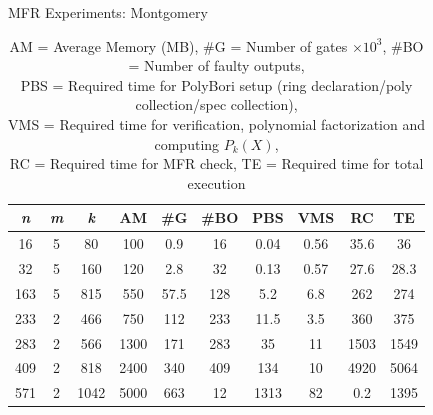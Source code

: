 \begin{frame}{\large MFR Experiments: Montgomery}

{\scriptsize
\begin{table}[bht]
\centering
\caption*{{\scriptsize AM = Average Memory (MB),
\#G = Number of gates $\times 10^3$, \#BO = Number of faulty outputs, 
\\PBS = Required time for PolyBori setup (ring declaration/poly collection/spec collection),
\\VMS = Required time for verification, polynomial factorization and computing $P_k(X)$, \\
RC = Required time for MFR check, TE = Required time for total execution}}
\label{montvsspec}
\begin{tabular}{| c | c | c | c | c | c | c | c | c | c |} \hline
{\textit{\textbf{n}}} & {\textit{\textbf{m}}} & {\textit{\textbf{k}}} & {\textbf{AM}} & {\textbf{\#G}} 
& {\textbf{\#BO}} & {\textbf{PBS}} & {\textbf{VMS}} & {\textbf{RC}} & {\textbf{TE}} \\ \hline 
16  & 5 & 80   & 100 & 0.9  & 16  & 0.04 & 0.56 & 35.6     & 36   \\ \hline
32  & 5 & 160  & 120 & 2.8  & 32  & 0.13 & 0.57 & 27.6     & 28.3 \\ \hline
163 & 5 & 815  & 550 & 57.5 & 128 & 5.2  & 6.8  & 262      & 274  \\ \hline
233 & 2 & 466  & 750 & 112  & 233 & 11.5 & 3.5  & 360      & 375  \\ \hline
283 & 2 & 566  & 1300& 171  & 283 & 35   & 11   & 1503     & 1549 \\ \hline
\rowcolor{red}409 & 2 & 818  & 2400& 340  & 409 & 134  & 10   & 4920 & 5064 \\ \hline
\rowcolor{green}571 & 2 & 1042 & 5000& 663  &  12 & 1313 & 82   & 0.2 & 1395 \\ \hline
\end{tabular}
\end{table}}

\end{frame}

